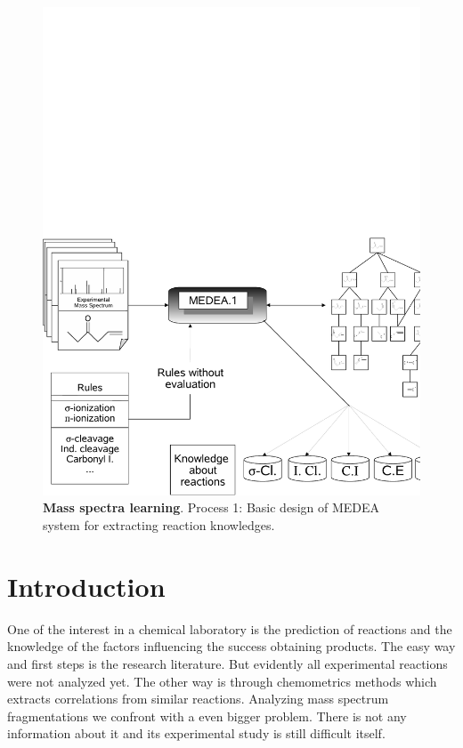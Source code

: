 \documentclass[10pt]{bmc_article}
\newenvironment{bmcformat}{\begin{raggedright}\baselineskip20pt\sloppy\setboolean{publ}{false}}{\end{raggedright}\baselineskip20pt\sloppy}
\begin{document}
\begin{bmcformat}
\begin{figure}[htp]
\begin{center}
\includegraphics[scale=.5]{figures/learningProcessRepresentation.pdf} \caption[Mass 
spectra learning]{{\bf{Mass spectra learning}}. Process 1: Basic design of 
MEDEA system for extracting reaction knowledges.}
\label{fig:learningProcessRepresentation}
\end{center}
\end{figure}



\section{Introduction}

One of the interest in a chemical laboratory is the prediction of reactions and 
the knowledge of the factors influencing the success obtaining products. The 
easy way and first steps is the research literature. But evidently all 
experimental reactions were not analyzed yet. The other way is through 
chemometrics methods which extracts correlations from similar reactions. 
Analyzing mass spectrum fragmentations we confront with a even bigger problem. 
There is not any information about it and its experimental study is still 
difficult itself.


\end{bmcformat}
\end{document}
